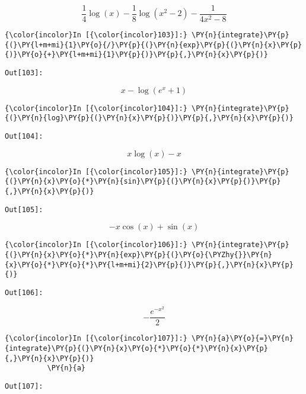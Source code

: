     \[\frac{1}{4} \log{\left (x \right )} - \frac{1}{8} \log{\left (x^{2} - 2 \right )} - \frac{1}{4 x^{2} - 8}\]

    

    \begin{Verbatim}[commandchars=\\\{\}]
{\color{incolor}In [{\color{incolor}103}]:} \PY{n}{integrate}\PY{p}{(}\PY{l+m+mi}{1}\PY{o}{/}\PY{p}{(}\PY{n}{exp}\PY{p}{(}\PY{n}{x}\PY{p}{)}\PY{o}{+}\PY{l+m+mi}{1}\PY{p}{)}\PY{p}{,}\PY{n}{x}\PY{p}{)}
\end{Verbatim}
\texttt{\color{outcolor}Out[{\color{outcolor}103}]:}
    
    \[x - \log{\left (e^{x} + 1 \right )}\]

    

    \begin{Verbatim}[commandchars=\\\{\}]
{\color{incolor}In [{\color{incolor}104}]:} \PY{n}{integrate}\PY{p}{(}\PY{n}{log}\PY{p}{(}\PY{n}{x}\PY{p}{)}\PY{p}{,}\PY{n}{x}\PY{p}{)}
\end{Verbatim}
\texttt{\color{outcolor}Out[{\color{outcolor}104}]:}
    
    \[x \log{\left (x \right )} - x\]

    

    \begin{Verbatim}[commandchars=\\\{\}]
{\color{incolor}In [{\color{incolor}105}]:} \PY{n}{integrate}\PY{p}{(}\PY{n}{x}\PY{o}{*}\PY{n}{sin}\PY{p}{(}\PY{n}{x}\PY{p}{)}\PY{p}{,}\PY{n}{x}\PY{p}{)}
\end{Verbatim}
\texttt{\color{outcolor}Out[{\color{outcolor}105}]:}
    
    \[- x \cos{\left (x \right )} + \sin{\left (x \right )}\]

    

    \begin{Verbatim}[commandchars=\\\{\}]
{\color{incolor}In [{\color{incolor}106}]:} \PY{n}{integrate}\PY{p}{(}\PY{n}{x}\PY{o}{*}\PY{n}{exp}\PY{p}{(}\PY{o}{\PYZhy{}}\PY{n}{x}\PY{o}{*}\PY{o}{*}\PY{l+m+mi}{2}\PY{p}{)}\PY{p}{,}\PY{n}{x}\PY{p}{)}
\end{Verbatim}
\texttt{\color{outcolor}Out[{\color{outcolor}106}]:}
    
    \[- \frac{e^{- x^{2}}}{2}\]

    

    \begin{Verbatim}[commandchars=\\\{\}]
{\color{incolor}In [{\color{incolor}107}]:} \PY{n}{a}\PY{o}{=}\PY{n}{integrate}\PY{p}{(}\PY{n}{x}\PY{o}{*}\PY{o}{*}\PY{n}{x}\PY{p}{,}\PY{n}{x}\PY{p}{)}
          \PY{n}{a}
\end{Verbatim}
\texttt{\color{outcolor}Out[{\color{outcolor}107}]:}
    
